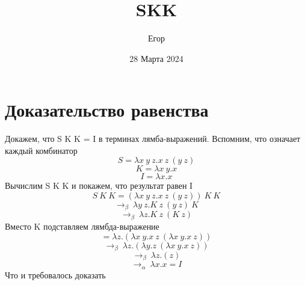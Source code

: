 \documentclass{article}
\title{\huge SKK}
\author{\LARGEШишкарев Егор}
\date{\large28 Марта 2024}
\begin{document}
\fontsize{14}{14}\selectfont
\maketitle

\section{Доказательство равенства}
Докажем, что S K K = I в терминах лямба-выражений.
Вспомним, что означает каждый комбинатор
\begin{equation}
    S = \lambda x~y~z.x~z~(y~z)
\end{equation}
\begin{equation}
    K = \lambda x~y.x
\end{equation}
\begin{equation}
    I = \lambda x.x
\end{equation}
Вычислим S K K и покажем, что результат равен I
\begin{equation}
    S~K~K = (\lambda x~y~z.x~z~(y~z))~K~K
\end{equation}
\begin{equation}
    \rightarrow_\beta~\lambda y~z.K~z~(y~z)~K    
\end{equation}
\begin{equation}
    \rightarrow_\beta~\lambda z.K~z~(K~z)  
\end{equation}
Вместо K подставляем лямбда-выражение
\begin{equation}
    = \lambda z.(\lambda x~y.x~z~(\lambda x~y.x~z))
\end{equation}
\begin{equation}
    \rightarrow_\beta~\lambda z.(\lambda y.z~(\lambda x~y.x~z))
\end{equation}
\begin{equation}
    \rightarrow_\beta~\lambda z.(z)
\end{equation}
\begin{equation}
    \rightarrow_\alpha~\lambda x.x = I
\end{equation}
Что и требовалось доказать
\end{document}
